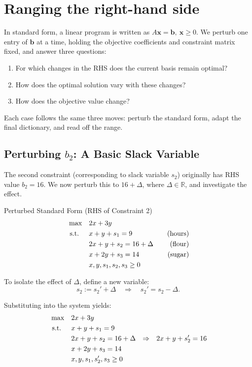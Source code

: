 \section{Ranging the right-hand side}
\label{sec:sensitivity-rhs}

In standard form, a linear program is written as \( A\mathbf{x} = \mathbf{b}, \ \mathbf{x} \geq 0 \). We perturb one entry of \( \mathbf{b} \) at a time, holding the objective coefficients and constraint matrix fixed, and answer three questions:
\begin{enumerate}
    \item For which changes in the RHS does the current basis remain optimal?
    \item How does the optimal solution vary with these changes?
    \item How does the objective value change?
\end{enumerate}
Each case follows the same three moves: perturb the standard form, adapt the final dictionary, and read off the range.

\subsection{Perturbing \( b_2 \): A Basic Slack Variable}

The second constraint (corresponding to slack variable \( s_2 \)) originally has RHS value \( b_2 = 16 \). We now perturb this to \( 16 + \Delta \), where \( \Delta \in \mathbb{R} \), and investigate the effect.

\begin{sensdisplay}{Perturbed Standard Form (RHS of Constraint 2)}
\[
\begin{aligned}
\max \quad & 2x + 3y \\
\mbox{ s.t. } \quad
& x + y + s_1 = 9 \quad & \mbox{(hours)} \\
& 2x + y + s_2 = 16 + \Delta \quad & \mbox{(flour)} \\
& x + 2y + s_3 = 14 \quad & \mbox{(sugar)} \\
& x, y, s_1, s_2, s_3 \geq 0
\end{aligned}
\]

To isolate the effect of \( \Delta \), define a new variable:
\[
s_2:= s_2' + \Delta \quad \Rightarrow \quad s_2' = s_2 - \Delta.
\]

Substituting into the system yields:
\[
\begin{aligned}
\max \quad & 2x + 3y \\
\mbox{ s.t. } \quad
& x + y + s_1 = 9 \\
& 2x + y + s_2= 16 + \Delta  & \Rightarrow &&  2x + y + s_2'= 16\\
& x + 2y + s_3 = 14 \\
& x, y, s_1, s_2', s_3 \geq 0
\end{aligned}
\]
\end{sensdisplay}

